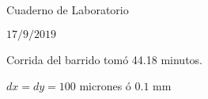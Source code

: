 \documentclass[12pt,dvipsnames]{exam}
\begin{document}
Cuaderno de Laboratorio

$17/9/2019$

Corrida del barrido tomó 44.18 minutos.

$dx = dy = 100$ micrones ó $0$.$1$ mm
\end{document}
